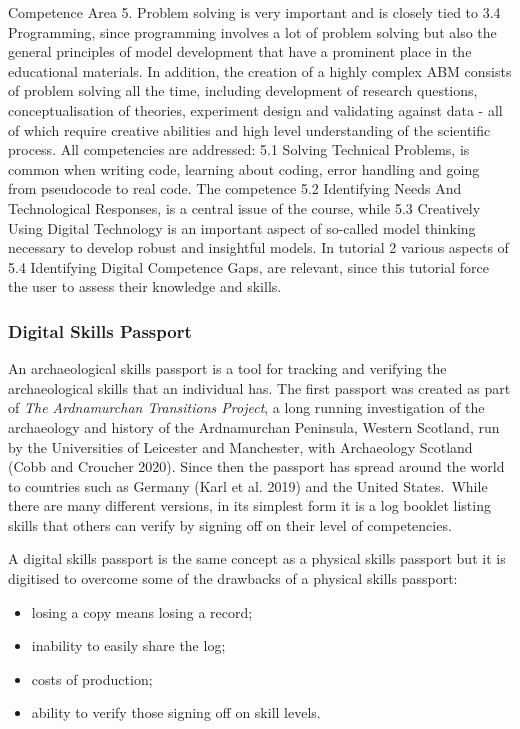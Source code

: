 \documentclass[
]{article}
\begin{document}
Competence Area 5. Problem solving is very important and is closely tied to 3.4 Programming, since programming involves a lot of problem solving but also the general principles of model development that have a prominent place in the educational materials. In addition, the creation of a highly complex ABM consists of problem solving all the time, including development of research questions, conceptualisation of theories, experiment design and validating against data - all of which require creative abilities and high level understanding of the scientific process. All competencies are addressed: 5.1 Solving Technical Problems, is common when writing code, learning about coding, error handling and going from pseudocode to real code. The competence 5.2 Identifying Needs And Technological Responses, is a central issue of the course, while 5.3 Creatively Using Digital Technology is an important aspect of so-called model thinking necessary to develop robust and insightful models. In tutorial 2 various aspects of 5.4 Identifying Digital Competence Gaps, are relevant, since this tutorial force the user to assess their knowledge and skills.

\hypertarget{digital-skills-passport}{%
\subsubsection{Digital Skills Passport}\label{digital-skills-passport}}

An archaeological skills passport is a tool for tracking and verifying the archaeological skills that an individual has. The first passport was created as part of \emph{The Ardnamurchan Transitions Project}, a long running investigation of the archaeology and history of the Ardnamurchan Peninsula, Western Scotland, run by the Universities of Leicester and Manchester, with Archaeology Scotland (Cobb and Croucher 2020). Since then the passport has spread around the world to countries such as Germany (Karl et al. 2019) and the United States.~While there are many different versions, in its simplest form it is a log booklet listing skills that others can verify by signing off on their level of competencies.~

A digital skills passport is the same concept as a physical skills passport but it is digitised to overcome some of the drawbacks of a physical skills passport:

\begin{itemize}
\item
  losing a copy means losing a record;
\item
  inability to easily share the log;
\item
  costs of production;
\item
  ability to verify those signing off on skill levels.~
\end{itemize}
\end{document}
